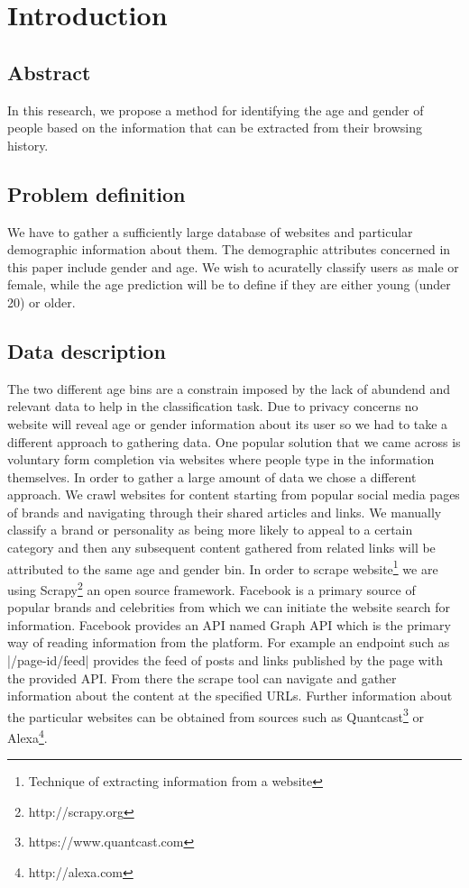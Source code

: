 \section{Introduction}

\subsection{Abstract}

In this research, we propose a method for identifying the age and gender of people based on the information that can be extracted from their browsing history.

\subsection{Problem definition}

We have to gather a sufficiently large database of websites and particular demographic information about them. The demographic attributes concerned in this paper include gender and age. We wish to acuratelly classify users as male or female, while the age prediction will be to define if they are either young (under 20) or older.

\subsection{Data description}

The two different age bins are a constrain imposed by the lack of abundend and relevant data to help in the classification task. Due to privacy concerns no website will reveal age or gender information about its user so we had to take a different approach to gathering data. One popular solution that we came across is voluntary form completion via websites where people type in the information themselves. In order to gather a large amount of data we chose a different approach. We crawl websites for content starting from popular social media pages of brands and navigating through their shared articles and links. We manually classify a brand or personality as being more likely to appeal to a certain category and then any subsequent content gathered from related links will be attributed to the same age and gender bin.
\newline
In order to scrape website\footnote{Technique of extracting information from a website} we are using Scrapy\footnote{http://scrapy.org} an open source framework. Facebook is a primary source of popular brands and celebrities from which we can initiate the website search for information. Facebook provides an API named Graph API which is the primary way of reading information from the platform. For example an endpoint such as |/{page-id}/feed| provides the feed of posts and links published by the page with the provided API. From there the scrape tool can navigate and gather information about the content at the specified URLs. Further information about the particular websites can be obtained from sources such as Quantcast\footnote{https://www.quantcast.com} or Alexa\footnote{http://alexa.com}.
